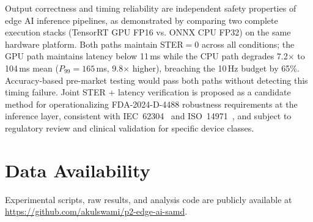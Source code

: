 \documentclass[11pt]{article}
\begin{document}
Output correctness and timing reliability are independent safety properties of edge
AI inference pipelines, as demonstrated by comparing two complete execution stacks
(TensorRT GPU FP16 vs. ONNX CPU FP32) on the same hardware platform. Both paths maintain STER$=0$ across all conditions; the GPU
path maintains latency below 11\,ms while the CPU path degrades 7.2$\times$ to
104\,ms mean ($P_{99}=165$\,ms, 9.8$\times$ higher), breaching the 10\,Hz budget by
65\%. Accuracy-based pre-market testing would pass both paths without detecting this
timing failure. Joint STER + latency verification is proposed as a candidate method
for operationalizing FDA-2024-D-4488 robustness requirements at the inference layer,
consistent with IEC~62304~\cite{iec62304} and ISO~14971~\cite{iso14971}, and subject
to regulatory review and clinical validation for specific device classes.

\section*{Data Availability}
Experimental scripts, raw results, and analysis code are publicly available at
\url{https://github.com/akulswami/p2-edge-ai-samd}.
\end{document}
